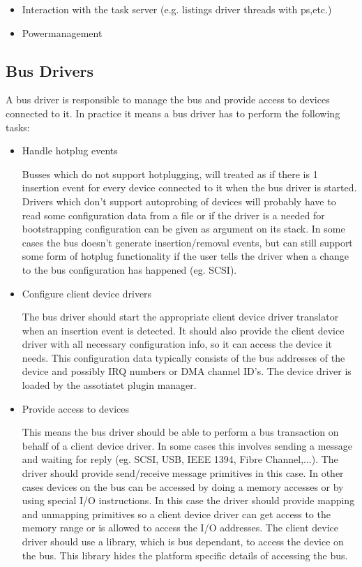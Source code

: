 \documentclass[9pt,a4paper]{extarticle}
\begin{document}
  \begin{itemize}
  \item Interaction with the task server (e.g. listings driver threads 
    with ps,etc.)
  \item Powermanagement
  \end{itemize}

\subsection{Bus Drivers}

A bus driver is responsible to manage the bus and provide access to
devices connected to it.  In practice it means a bus driver has to
perform the following tasks:

\begin{itemize}
\item Handle hotplug events
  
  Busses which do not support hotplugging, will treated as if there is
  1 insertion event for every device connected to it when the bus
  driver is started.  Drivers which don't support autoprobing of
  devices will probably have to read some configuration data from a
  file or if the driver is a needed for bootstrapping configuration
  can be given as argument on its stack.  In some cases the bus
  doesn't generate insertion/removal events, but can still support
  some form of hotplug functionality if the user tells the driver when
  a change to the bus configuration has happened (eg. SCSI).

\item Configure client device drivers
    
  The bus driver should start the appropriate client device driver
  translator when an insertion event is detected.  It should also
  provide the client device driver with all necessary configuration
  info, so it can access the device it needs.  This configuration data
  typically consists of the bus addresses of the device and possibly
  IRQ numbers or DMA channel ID's.  The device driver is loaded by the
  assotiatet plugin manager.

\item Provide access to devices
  
  This means the bus driver should be able to perform a bus
  transaction on behalf of a client device driver.  In some cases this
  involves sending a message and waiting for reply (eg. SCSI, USB,
  IEEE 1394, Fibre Channel,...).  The driver should provide
  send/receive message primitives in this case.  In other cases
  devices on the bus can be accessed by doing a memory accesses or by
  using special I/O instructions.  In this case the driver should
  provide mapping and unmapping primitives so a client device driver
  can get access to the memory range or is allowed to access the I/O
  addresses.  The client device driver should use a library, which is
  bus dependant, to access the device on the bus.  This library hides
  the platform specific details of accessing the bus.
  

\end{itemize}
\end{document}
